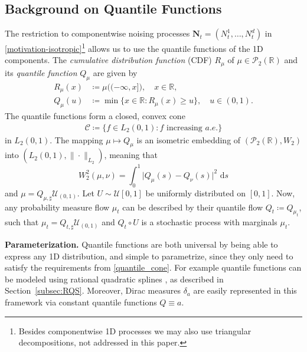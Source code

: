 \documentclass{article}
\newcommand{\R}{\mathbb{R}}
\renewcommand{\d}{\, \mathrm{d}}
\theoremstyle{plain}
\theoremstyle{definition}
\theoremstyle{remark}
\begin{document}
\subsection{Background on Quantile Functions}\label{sec:qprocess}
The restriction to componentwise noising processes $\mathbf N_t = (N_t^1,\dots,N_t^d)$ in 
\eqref{motivation-isotropic}\footnote{Besides componentwise 1D processes we may also use triangular decompositions, not addressed in this paper.}
allows us to use the quantile functions of the 1D components.
The \emph{cumulative distribution function} (CDF)  $R_\mu$
of $\mu \in \mathcal P_2(\R)$ 
and its
\emph{quantile function} 
$Q_\mu$ are given by
\begin{align}\label{cdf-and-quantile}
R_\mu(x) &\coloneqq \mu\big( (-\infty, x] \big), \quad x \in \R, \\
Q_{\mu}(u) &\coloneqq \min\{ x \in \R:  R_\mu(x) \ge u \}, \quad u \in (0,1).
\end{align}
The quantile functions form a closed, convex cone 
\begin{align}\label{quantile_cone}
    \mathcal C \coloneqq \{ f \in L_2(0,1): f \text{ increasing } a.e.\}   
\end{align}
in $L_2(0,1)$. The mapping
$\mu \mapsto Q_\mu$
is an  isometric embedding of 
$(\mathcal P_2(\R),W_2)$ into
$(L_2(0,1),\|\cdot\|_{L_2})$,
meaning that
\begin{equation}    \label{eq:1d_continuous_quantile_formula}
    W_2^2(\mu, \nu) = \int_0^1 \big|Q_\mu(s) - Q_{\nu}(s)\big|^2 \, \d s
\end{equation}
and $\mu = Q_{\mu, \sharp} \mathcal{U}_{(0,1)}$.
Let $U \sim \mathcal{U}[0,1]$ be uniformly distributed on $[0,1]$.
Now, any probability measure flow $\mu_t$ can be described by their quantile flow $Q_t \coloneqq Q_{\mu_t}$, such that $\mu_t = Q_{t, \sharp} \mathcal{U}_{(0,1)}$ and $Q_t \circ U$  is a stochastic process with marginals $\mu_t$. 

\textbf{Parameterization.} Quantile functions are both universal by being able to express any 1D distribution, and simple to parametrize, since they only need to satisfy the requirements from \eqref{quantile_cone}. For example quantile functions can be modeled using rational quadratic splines \cite{GD1982,durkan2019neural}, as described in Section~\ref{subsec:RQS}. Moreover, Dirac measures $\delta_a$ are easily represented in this framework via constant quantile functions $Q \equiv a$.
\end{document}
